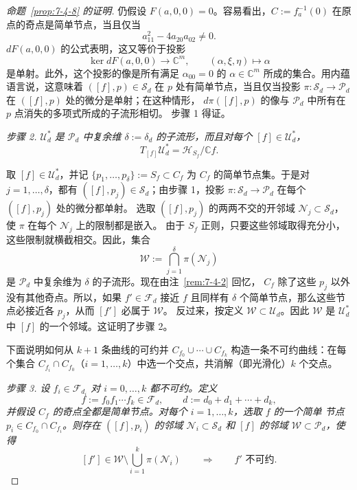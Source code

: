 \begin{proof}[命题~\ref{prop:7-4-8} 的证明]
仍假设 $F(a,0,0)=0$。容易看出，$C:=f_a^{-1}(0)$ 在原点的奇点是简单节点，当且仅当
\[
  a_{11}^2-4a_{20}a_{02}\ne0.
\]
$dF(a,0,0)$ 的公式表明，这又等价于投影
\[
  \ker dF(a,0,0)\longrightarrow\mathbb C^m,
  \qquad(\alpha,\xi,\eta)\longmapsto\alpha
\]
是单射。此外，这个投影的像是所有满足 $\alpha_{00}=0$ 的
$\alpha\in\mathbb C^m$ 所成的集合。用内蕴语言说，这意味着
$([f],p)\in\mathcal S_d$ 在 $p$ 处有简单节点，当且仅当投影
$\pi:\mathcal S_d\to\mathcal P_d$ 在 $([f],p)$ 处的微分是单射；在这种情形，
$d\pi([f],p)$ 的像与 $\mathcal P_d$ 中所有在 $p$ 点消失的多项式所成的子流形相切。
步骤 1 得证。

\emph{步骤 2. $\mathcal U_d^*$ 是 $\mathcal P_d$ 中复余维
$\delta:=\delta_d$ 的子流形，而且对每个 $[f]\in\mathcal U_d^*$，}
\[
  T_{[f]}\mathcal U_d^*=\mathcal H_{S_f}/\mathbb C f.
\]

取 $[f]\in\mathcal U_d^*$，并记
$\{p_1,\ldots,p_\delta\}:=S_f\subset C_f$ 为 $C_f$ 的简单节点集。于是对
$j=1,\ldots,\delta$，都有 $([f],p_j)\in\mathcal S_d$；由步骤 1，投影
$\pi:\mathcal S_d\to\mathcal P_d$ 在每个 $([f],p_j)$ 处的微分都单射。
选取 $([f],p_j)$ 的两两不交的开邻域
$\mathcal N_j\subset\mathcal S_d$，使 $\pi$ 在每个 $\mathcal N_j$ 上的限制都是嵌入。
由于 $S_f$ 正则，只要这些邻域取得充分小，这些限制就横截相交。因此，集合
\[
  \mathcal W:=\bigcap_{j=1}^\delta\pi(\mathcal N_j)
\]
是 $\mathcal P_d$ 中复余维为 $\delta$ 的子流形。现在由注~\ref{rem:7-4-2} 回忆，
$C_f$ 除了这些 $p_j$ 以外没有其他奇点。所以，如果 $f'\in\mathcal F_d$ 接近 $f$ 且同样有
$\delta$ 个简单节点，那么这些节点必接近各 $p_j$，从而 $[f']$ 必属于 $\mathcal W$。
反过来，按定义 $\mathcal W\subset\mathcal U_d$。因此 $\mathcal W$ 是
$\mathcal U_d^*$ 中 $[f]$ 的一个邻域。这证明了步骤 2。

下面说明如何从 $k+1$ 条曲线的可约并
$C_{f_0}\cup\cdots\cup C_{f_k}$ 构造一条不可约曲线：在每个集合
$C_{f_i}\cap C_{f_0}$（$i=1,\ldots,k$）中选一个交点，共消解（即光滑化）$k$ 个交点。

\emph{步骤 3. 设 $f_i\in\mathcal F_{d_i}$ 对 $i=0,\ldots,k$ 都不可约。定义}
\[
  f:=f_0f_1\cdots f_k\in\mathcal F_d,
  \qquad d:=d_0+d_1+\cdots+d_k,
\]
\emph{并假设 $C_f$ 的奇点全都是简单节点。对每个 $i=1,\ldots,k$，选取 $f$ 的一个简单
节点 $p_i\in C_{f_0}\cap C_{f_i}$。则存在 $([f],p_i)$ 的邻域
$\mathcal N_i\subset\mathcal S_d$ 和 $[f]$ 的邻域 $\mathcal W\subset\mathcal P_d$，使得}
\[
  [f']\in\mathcal W\setminus\bigcup_{i=1}^k\pi(\mathcal N_i)
  \qquad\Longrightarrow\qquad f'\text{ 不可约}.
\]


\end{proof}
